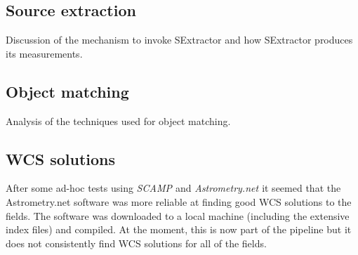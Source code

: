 \subsection{Source extraction}

Discussion of the mechanism to invoke SExtractor and how SExtractor produces its measurements. 

\subsection{Object matching}

Analysis of the techniques used for object matching.

\subsection{WCS solutions}
After some ad-hoc tests using \emph{SCAMP \cite{scamp}} and \emph{Astrometry.net \cite{astrometry}} it seemed that the Astrometry.net software was more reliable at finding good WCS solutions to the fields. The software was downloaded to a local machine (including the extensive index files) and compiled. At the moment, this is now part of the pipeline but it does not consistently find WCS solutions for all of the fields. 


